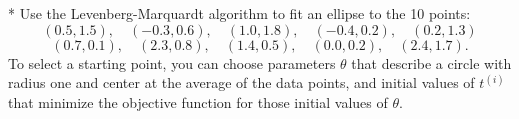 * Use the Levenberg-Marquardt algorithm to fit an ellipse to the 10 points: \[(0.5,1.5),\quad(-0.3,0.6),\quad(1.0,1.8),\quad(-0.4,0.2),\quad(0.2,1.3)\] \[(0.7,0.1),\quad(2.3,0.8),\quad(1.4,0.5),\quad(0.0,0.2),\quad(2.4,1.7).\] To select a starting point, you can choose parameters \(\theta\) that describe a circle with radius one and center at the average of the data points, and initial values of \(t^{(i)}\) that minimize the objective function for those initial values of \(\theta\).

 